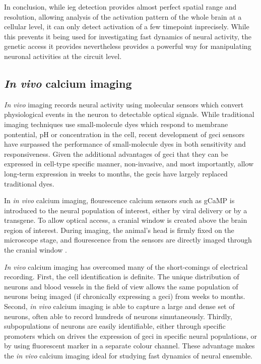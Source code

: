 In conclusion, while \gls{ieg} detection provides almost perfect spatial range and resolution, allowing analysis of the activation pattern of the whole brain at a cellular level, it can only detect activation of a few timepoint inprecisely. While this prevents it being used for investigating fast dynamics of neural activity, the genetic access it provides nevertheless provides a powerful way for manipulating neuronal activities at the circuit level.


\subsection{\textit{In vivo} calcium imaging}

\textit{In vivo} imaging records neural activity using molecular sensors which convert physiological events in the neuron to detectable optical signals. While traditional imaging techniques use small-molecule dyes which respond to membrane pontential, pH or  concentration in the cell, recent development of \gls{geci}  sensors have surpassed the performance of small-molecule  dyes in both sensitivity and responsiveness. Given the additional advantages of \gls{geci} that they can be expressed in cell-type specific manner, non-invasive, and most importantly, allow long-term expression in weeks to months, the \glspl{geci} have largely replaced traditional dyes. 

In \textit{in vivo} calcium imaging, flourescence calcium sensors such as gCaMP is introduced to the neural population of interest, either by viral delivery or by a transgene. To allow optical access, a cranial window is created above the brain region of interest. During imaging, the animal's head is firmly fixed on the microscope stage, and flourescence from the sensors are directly imaged through the cranial window \citep{}. 

\textit{In vivo} calcium imaging has overcomed many of the short-comings of electrical recording. First, the cell identification is definite. The unique distribution of neurons and blood vessels in the field of view allows the same population of neurons being imaged (if chronically expressing a \gls{geci}) from weeks to months. Second, \textit{in vivo} calcium imaging is able to capture a large and dense set of neurons, often able to record hundreds of neurons simutaneously. Thirdly, subpopulations of neurons are easily identifiable, either through specific promoters which on drives the expression of \gls{geci} in specific neural populations, or by using fluorescent marker in a separate colour channel. These advantage makes the \textit{in vivo} calcium imaging ideal for studying fast dynamics of neural ensemble. 


